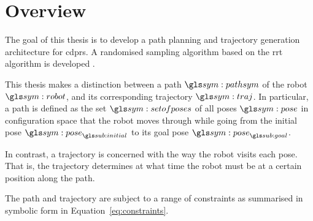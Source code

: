 \chapter{Overview}%
\label{chap:overview}

	The goal of this thesis is to develop a path planning and trajectory
	generation architecture for \glspl{cdpr}. A randomised sampling algorithm
	based on the \gls{rrt} algorithm is developed
	\cite{bib:planning:rapidly-exploring_random_trees_a_new_tool_for_path_planning}.

	This thesis makes a distinction between a path $\pathsym$ of the robot
	$\robot$, and its corresponding trajectory $\traj$. In particular, a path is
	defined as the set $\setofposes$ of all poses $\pose$ in configuration space
	that the robot moves through while going from the initial pose
	$\pose_{\initial}$ to its goal pose $\pose_{\goal}$.

	In contrast, a trajectory is concerned with the way the robot visits each
	pose. That is, the trajectory determines at what time the robot must be at a
	certain position along the path.

	The path and trajectory are subject to a range of constraints as summarised
	in symbolic form in Equation~\ref{eq:constraints}.

